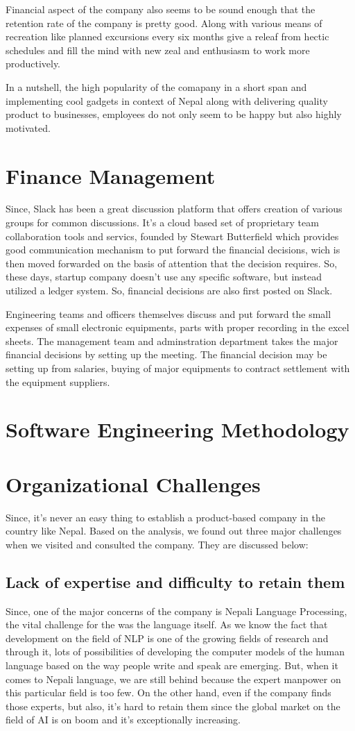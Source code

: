 \documentclass[12pt,a4paper]{scrreprt}
\begin{document}
Financial aspect of the company also seems to be sound enough that the retention rate of the company is pretty good. Along with various means of recreation like planned excursions every six months give a releaf from hectic schedules and fill the mind with new zeal and enthusiasm to work more productively.
 
In a nutshell, the high popularity of the comapany in a short span and implementing cool gadgets in context of Nepal along with delivering quality product to businesses, employees do not only seem to be happy but also highly motivated.

\chapter{Finance Management}
Since, Slack has been a great discussion platform that offers creation of various groups for common discussions. It's a cloud based set of proprietary team collaboration tools and servics, founded by Stewart Butterfield which provides good communication mechanism to put forward the financial decisions, wich is then moved forwarded on the basis of attention that the decision requires. So, these days, startup company doesn't use any specific software, but instead utilized a ledger system. So, financial decisions are also first posted on Slack.\par
Engineering teams and officers themselves discuss and put forward the small expenses of small electronic equipments, parts with proper recording in the excel sheets. The management team and adminstration department takes the major financial decisions by setting up the meeting. The financial decision may be setting up from salaries, buying of major equipments to contract settlement with the equipment suppliers.
\chapter{Software Engineering Methodology}

\chapter{Organizational Challenges}
Since, it's never an easy thing to establish a product-based company in the country like Nepal. Based on the analysis, we found out three major challenges when we visited and consulted the company. They are discussed below:
\section{Lack of expertise and difficulty to retain them}
Since, one of the major concerns of the company is Nepali Language Processing, the vital challenge for the was the language itself. As we know the fact that development on the field of NLP is one of the growing fields of research and through it, lots of possibilities of developing the computer models of the human language based on the way people write and speak are emerging. But, when it comes to Nepali language, we are still behind because the expert manpower on this particular field is too few. On the other hand, even if the company finds those experts, but also, it's hard to retain them since the global market on the field of AI is on boom and it's exceptionally increasing.
\end{document}
